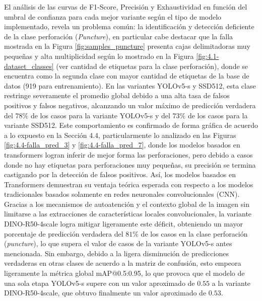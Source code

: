 El análisis de las curvas de F1-Score, Precisión y Exhaustividad en función del umbral de confianza para cada mejor variante según el tipo de modelo implementado, revela un problema común: la identificación y detección deficiente de la clase perforación (\textit{Puncture}), en particular cabe destacar que la falla mostrada en la Figura \ref{fig:samples_puncture} presenta cajas delimitadoras muy pequeñas y alta multiplicidad según lo mostrado en la Figura \ref{fig:4.1-dataset_classes} (ver cantidad de etiquetas para la clase perforación), donde se encuentra como la segunda clase con mayor cantidad de etiquetas de la base de datos (919 para entrenamiento). En las variantes YOLOv5-s y SSD512, esta clase restringe severamente el promedio global debido a una alta tasa de falsos positivos y falsos negativos, alcanzando un valor máximo de predicción verdadera del $78\%$ de los casos para la variante YOLOv5-s y del $73\%$ de los casos para la variante SSD512. Este comportamiento es confirmado de forma gráfica de acuerdo a lo expuesto en la Sección 4.4, particularmente lo analizado en las Figuras \ref{fig:4.4-falla_pred_3} y \ref{fig:4.4-falla_pred_7}, donde los modelos basados en transformers logran inferir de mejor forma las perforaciones, pero debido a casos donde no hay etiquetas para perforaciones muy pequeñas, su precisión se termina castigando por la detección de falsos positivos. Así, los modelos basados en Transformers demuestran su ventaja teórica esperada con respecto a los modelos tradicionales basados solamente en redes neuronales convolucionales (CNN). Gracias a los mecanismos de autoatención y el contexto global de la imagen sin limitarse a las extracciones de características locales convolucionales, la variante DINO-R50-4scale logra mitigar ligeramente este déficit, obteniendo un mayor porcentaje de predicción verdadera del $81\%$ de los casos en la clase perforación (\textit{puncture}), lo que supera el valor de casos de la variante YOLOv5-s antes mencionada. Sin embargo, debido a la ligera disminución de predicciones verdaderas en otras clases de acuerdo a la matriz de confusión, esto empeora ligeramente la métrica global mAP@0.5:0.95, lo que provoca que el modelo de una sola etapa YOLOv5-s supere con un valor aproximado de $0.55$ a la variante DINO-R50-4scale, que obtuvo finalmente un valor aproximado de $0.53$. \\

